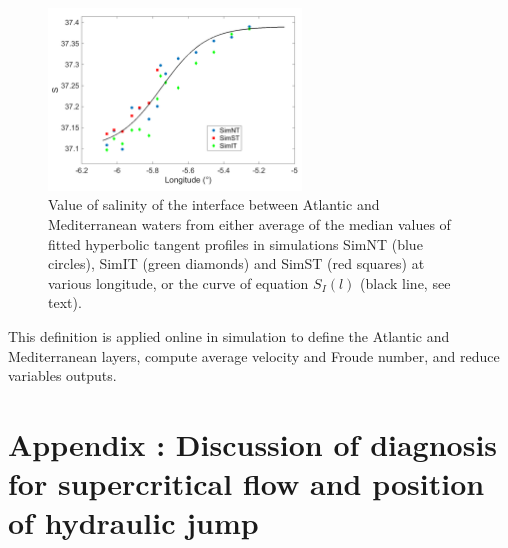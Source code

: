 \begin{figure}[!h]
 \centering
 \includegraphics[width=0.6\textwidth]{./GBR3D/salinite_interface_papier.png}
 \caption [Value of salinity of the interface between Atlantic and Mediterranean waters]{Value of salinity of the interface between Atlantic and Mediterranean waters from either average of the median values of fitted hyperbolic tangent profiles in simulations SimNT (blue circles), SimIT (green diamonds) and SimST (red squares) at various longitude, or the curve of equation $S_I(l)$ (black line, see text).}
 \label{fig_defintf}
\end{figure}

This definition is applied online in simulation to define the Atlantic and Mediterranean layers, compute average velocity and Froude number, and reduce variables outputs.


\section{Appendix : Discussion of diagnosis for supercritical flow and position of hydraulic jump}
\label{appendix_compdiag}

